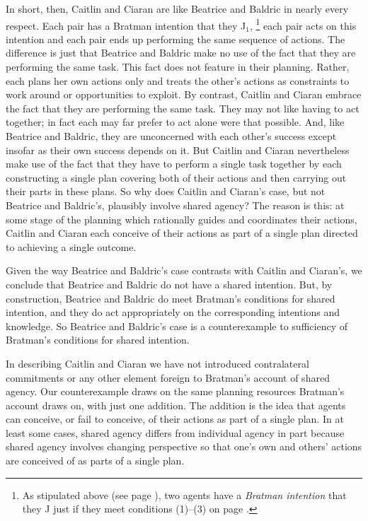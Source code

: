 \documentclass[12pt,\papersize]{extarticle}
\begin{document}
In short, then, Caitlin and Ciaran are like Beatrice and Baldric in nearly every respect. 
Each pair has a Bratman intention that they J$_1$,%
\footnote{
As stipulated above (see page \pageref*{df:bratman_intention}), 
two agents have a \emph{Bratman intention} that they J just if they meet conditions (1)--(3) on page \pageref{quote:bratman_account}.
}
%
 each pair acts on this intention and each pair ends up performing the same sequence of actions.
The difference is just that Beatrice and Baldric make no use of the fact that they are performing the same task.
	This fact does not feature in their planning. 
	Rather, each plans her own actions only and treats the other's actions as constraints to work around or opportunities to exploit.
By contrast, Caitlin and Ciaran embrace the fact that they are performing the same task. 
They may not like having to act together; in fact each may far prefer to act alone were that possible.
And, like Beatrice and Baldric, they are unconcerned with each other's success except insofar as their own success depends on it.
But Caitlin and Ciaran nevertheless make use of the fact that they have to perform a single task together by each constructing a single plan covering both of their actions and then carrying out their parts in these plans.
So why does Caitlin and Ciaran's case, but not Beatrice and Baldric's, plausibly involve shared agency?
The reason is  this:
	 at some stage of the planning which rationally guides and coordinates their actions,
	Caitlin and Ciaran each conceive of their actions as part of a single plan directed to achieving a single outcome.


Given the way Beatrice and Baldric's case contrasts with Caitlin and Ciaran's,
we conclude that Beatrice and Baldric do not have a shared intention.
But, by construction, 
 Beatrice and Baldric do meet Bratman's conditions for shared intention, and they do act appropriately on the corresponding intentions and knowledge. 
 So Beatrice and Baldric's case  is a counterexample to sufficiency of Bratman's conditions for shared intention.


In describing Caitlin and Ciaran we have not introduced contralateral commitments or any other element foreign to Bratman's account of shared agency. 
Our counterexample draws on the same planning resources Bratman's account draws on, with just one addition.
The addition is the idea that agents can conceive, or fail to conceive, of their actions as part of a single plan. 
In at least some cases, shared agency differs from individual agency in part because shared agency involves changing perspective so that one’s own and others' actions are conceived of as parts of a single plan.
\end{document}
